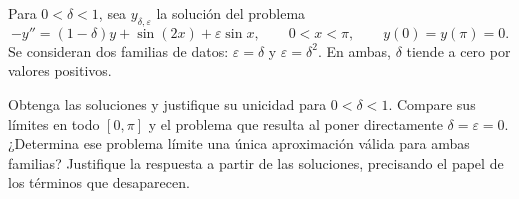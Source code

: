 Para \(0<\delta<1\), sea \(y_{\delta,\varepsilon}\) la solución del problema
\[
-y''=(1-\delta)y+\sin(2x)+\varepsilon\sin x,
\qquad 0<x<\pi,\qquad y(0)=y(\pi)=0.
\]
Se consideran dos familias de datos: \(\varepsilon=\delta\) y \(\varepsilon=\delta^2\). En ambas, \(\delta\) tiende a cero por valores positivos.

Obtenga las soluciones y justifique su unicidad para \(0<\delta<1\). Compare sus límites en todo \([0,\pi]\) y el problema que resulta al poner directamente \(\delta=\varepsilon=0\). ¿Determina ese problema límite una única aproximación válida para ambas familias? Justifique la respuesta a partir de las soluciones, precisando el papel de los términos que desaparecen.
